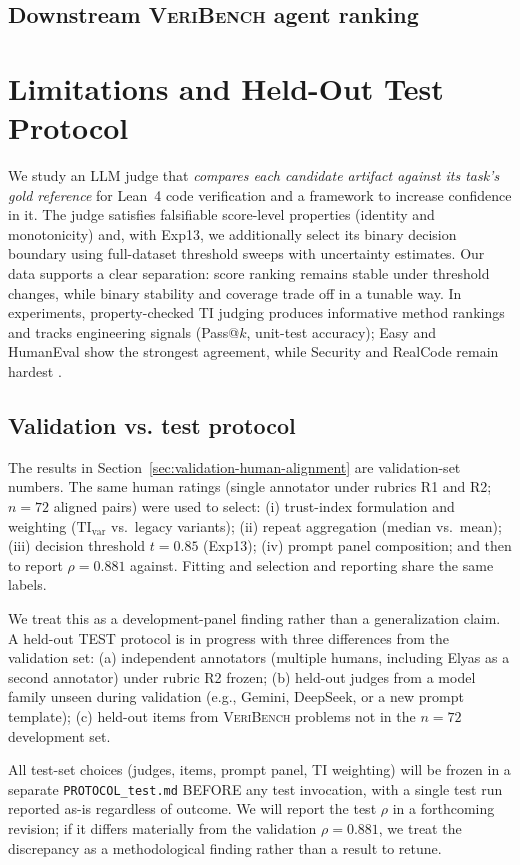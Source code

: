 \documentclass{article}
\begin{document}
\subsection{Downstream \textsc{VeriBench} agent ranking}
\section{Limitations and Held-Out Test Protocol}
We study an LLM judge that \emph{compares each candidate artifact against its task’s gold reference} for Lean~4 code verification and a framework to increase confidence in it.
The judge satisfies falsifiable score-level properties (identity and monotonicity) and, with Exp13, we additionally select its binary decision boundary using full-dataset threshold sweeps with uncertainty estimates.
Our data supports a clear separation: score ranking remains stable under threshold changes, while binary stability and coverage trade off in a tunable way.
In experiments, property-checked TI judging produces informative method rankings and tracks engineering signals (Pass@$k$, unit-test accuracy); Easy and HumanEval show the strongest agreement, while Security and RealCode remain hardest \citep{chen2021evaluating}.

\subsection{Validation vs. test protocol}
The results in Section~\ref{sec:validation-human-alignment} are validation-set numbers.
The same human ratings (single annotator under rubrics R1 and R2; \(n=72\) aligned pairs) were used to select:
(i) trust-index formulation and weighting (\(\mathrm{TI}_{\mathrm{var}}\) vs.\ legacy variants);
(ii) repeat aggregation (median vs.\ mean);
(iii) decision threshold \(t=0.85\) (Exp13);
(iv) prompt panel composition;
and then to report \(\rho=0.881\) against.
Fitting and selection and reporting share the same labels.

We treat this as a development-panel finding rather than a generalization claim.
A held-out TEST protocol is in progress with three differences from the validation set:
(a) independent annotators (multiple humans, including Elyas as a second annotator) under rubric R2 frozen;
(b) held-out judges from a model family unseen during validation (e.g., Gemini, DeepSeek, or a new prompt template);
(c) held-out items from \textsc{VeriBench} problems not in the \(n=72\) development set.

All test-set choices (judges, items, prompt panel, TI weighting) will be frozen in a separate \texttt{PROTOCOL\_test.md} BEFORE any test invocation, with a single test run reported as-is regardless of outcome.
We will report the test \(\rho\) in a forthcoming revision; if it differs materially from the validation \(\rho=0.881\), we treat the discrepancy as a methodological finding rather than a result to retune.
\end{document}
